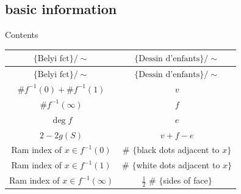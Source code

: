 \documentclass[pdf]{beamer}
\numberwithin{equation}{section}
\theoremstyle{plain}
\theoremstyle{plain}
\theoremstyle{remark}
\begin{document}
\subsection{basic information}
\begin{frame}{Contents}
\end{frame}
\begin{frame}[fragile]
		\begin{longtable}{c|c}
		\hline
		$\{\text{Belyi fct}\}/\sim$ & $\{\text{Dessin d'enfants}\}/\sim$	\\
		
		\hline
		\endhead
		\hline
		$\{\text{Belyi fct}\}/\sim$ & $\{\text{Dessin d'enfants}\}/\sim$	\\
		
		\hline
		\endfirsthead	
		\hline
		\endfoot
		\hline		
		\endlastfoot
		
		$\# f^{-1}(0) + \# f^{-1}(1)$ & $v$\\
		$\# f^{-1}(\infty)$ & $f$ \\
		$\deg f$ & $e$\\
		$2-2g(S)$ & $v+f-e$\\
		Ram index of $x \in f^{-1}(0)$ & $\#$ $\{$black dots adjacent to $x\}$\\
		Ram index of $x \in f^{-1}(1)$ & $\#$ $\{$white dots adjacent to $x\}$\\
		Ram index of $x \in f^{-1}(\infty)$ & $\frac{1}{2}$ $\#$ $\{$sides of face$\}$\\
		
		
		
		\hline								
	\end{longtable}
\end{frame}
\end{document}
